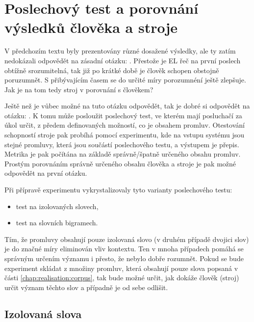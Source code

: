 \section{Poslechový test a porovnání výsledků člověka a stroje}
\label{chap:realisation:listening}

V předchozím textu byly prezentovány různé dosažené výsledky, ale ty zatím nedokázali odpovědět na zásadní otázku: . Přestože je EL řeč na první poslech obtížně srozumitelná, tak již po krátké době je člověk schopen obstojně poruzumnět. S přibývajícím časem se do určité míry porozumnéní ještě zlepšuje. Jak je na tom tedy stroj v porovnání s člověkem?

Ještě než je vůbec možné na tuto otázku odpovědět, tak je dobré si odpovědět na otázku: . K tomu může posloužit poslechový test, ve kterém mají posluchačí za úkol určit, z předem definovaných možností, co je obsahem promluv. Otestování schopností stroje pak probíhá pomocí experimentu, kde na vstupu systému jsou stejné promluvy, která jsou součástí poslechového testu, a výstupem je přepis. Metrika je pak počítána na základě správně/špatně určeného obsahu promluv. Prostým porovnáním správně určeného obsahu člověka a stroje je pak možné odpovědět na první  otázku.

Při přípravě experimentu vykrystalizovaly tyto varianty poslechového testu:

\begin{itemize}
  \item test na izolovaných slovech,
  \item test na slovních bigramech.
\end{itemize}

\noindent Tím, že promluvy obsahují pouze izolovaná slovo (v druhém případě dvojici slov) je do značné míry eliminován vliv kontextu. Ten v mnoha případech pomáhá se správným určením významu i přesto, že nebylo dobře rozumnět. Pokud se bude experiment skládat z množiny promluv, která obsahují pouze slova popsaná v části \ref{chap:realisation:corpus}, tak bude možné určit, jak  dokáže člověk (stroj) určit význam těchto slov a případně je od sebe odlišit.

\subsection{Izolovaná slova}
\label{chap:realisation:listening:isolated}


